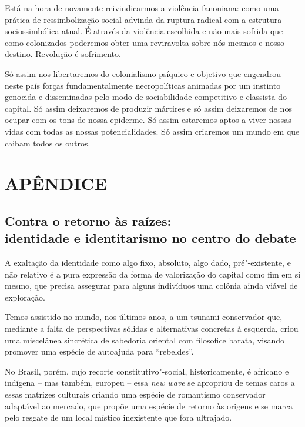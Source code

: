 Está na hora de novamente reivindicarmos a violência fanoniana: como uma
prática de ressimbolização social advinda da ruptura radical com a
estrutura sociossimbólica atual. É através da violência escolhida e não
mais sofrida que como colonizados poderemos obter uma reviravolta sobre
nós mesmos e nosso destino. Revolução é sofrimento.

Só assim nos libertaremos do colonialismo psíquico e objetivo que
engendrou neste país forças fundamentalmente necropolíticas animadas por
um instinto genocida e disseminadas pelo modo de sociabilidade
competitivo e classista do capital. Só assim deixaremos de produzir
mártires e só assim deixaremos de nos ocupar com os tons de nossa
epiderme. Só assim estaremos aptos a viver nossas vidas com todas as
nossas potencialidades. Só assim criaremos um mundo em que caibam todos
os outros.

\part{APÊNDICE}

\chapter*{Contra o retorno às raízes:\\ identidade e identitarismo no centro do debate}

A exaltação da identidade como algo
fixo, absoluto, algo dado,
pré"-existente, e não relativo é a pura expressão da forma de valorização
do capital como fim em si mesmo, que precisa assegurar para alguns
indivíduos uma colônia ainda viável de exploração.

Temos assistido no mundo, nos últimos anos, a um tsunami conservador
que, mediante a falta de perspectivas sólidas e alternativas concretas à
esquerda, criou uma miscelânea sincrética de sabedoria oriental com
filosofice barata, visando promover uma espécie de autoajuda para
``rebeldes''.

No Brasil, porém, cujo recorte constitutivo"-social, historicamente, é
africano e indígena -- mas também, europeu -- essa \emph{new wave} se
apropriou de temas caros a essas matrizes culturais criando uma espécie
de romantismo conservador adaptável ao mercado, que propõe uma espécie
de retorno às origens e se marca pelo resgate de um local místico
inexistente que fora ultrajado.

